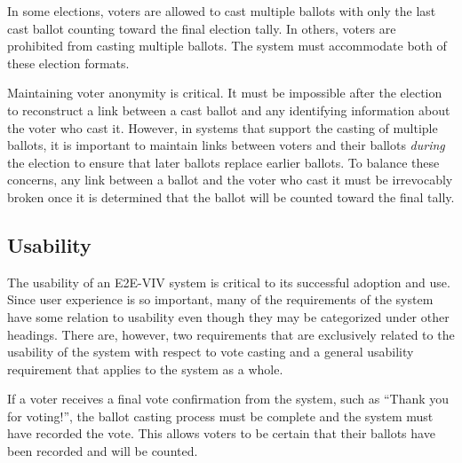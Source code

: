 In some elections, voters are allowed to cast multiple ballots with
only the last cast ballot counting toward the final election tally. In
others, voters are prohibited from casting multiple ballots. The
system must accommodate both of these election formats.

Maintaining voter anonymity is critical. It must be impossible after
the election to reconstruct a link between a cast ballot and any
identifying information about the voter who cast it. However, in
systems that support the casting of multiple ballots, it is important
to maintain links between voters and their ballots \emph{during} the
election to ensure that later ballots replace earlier ballots. To
balance these concerns, any link between a ballot and the voter who
cast it must be irrevocably broken once it is determined that the
ballot will be counted toward the final tally.

%

\subsection{Usability}

The usability of an E2E-VIV system is critical to its successful
adoption and use. Since user experience is so important, many of the
requirements of the system have some relation to usability even though
they may be categorized under other headings. There are, however, two
requirements that are exclusively related to the usability of the
system with respect to vote casting and a general usability
requirement that applies to the system as a whole.

If a voter receives a final vote confirmation from the system, such as
``Thank you for voting!'', the ballot casting process must be complete
and the system must have recorded the vote. This allows voters to be
certain that their ballots have been recorded and will be counted.

